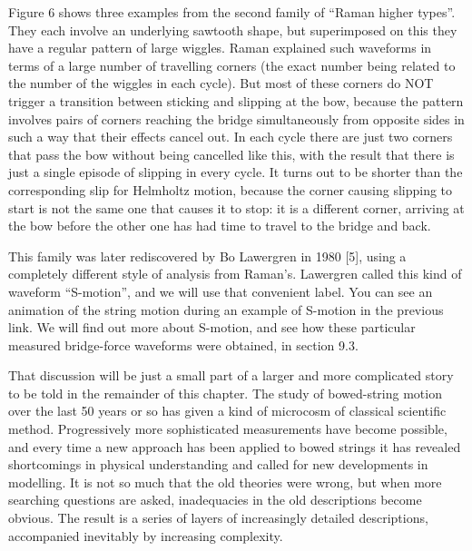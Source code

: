   Figure 6 shows three examples from the second family of “Raman higher types”. 
  They each involve an underlying sawtooth shape, but superimposed on this they 
  have a regular pattern of large wiggles. Raman explained such waveforms in 
  terms of a large number of travelling corners (the exact number being related 
  to the number of the wiggles in each cycle). But most of these corners do NOT 
  trigger a transition between sticking and slipping at the bow, because the 
  pattern involves pairs of corners reaching the bridge simultaneously from 
  opposite sides in such a way that their effects cancel out. In each cycle 
  there are just two corners that pass the bow without being cancelled like 
  this, with the result that there is just a single episode of slipping in 
  every cycle. It turns out to be shorter than the corresponding slip for 
  Helmholtz motion, because the corner causing slipping to start is not the 
  same one that causes it to stop: it is a different corner, arriving at the 
  bow before the other one has had time to travel to the bridge and back. 


  This family was later rediscovered by Bo Lawergren in 1980 [5], using a 
  completely different style of analysis from Raman’s. Lawergren called this 
  kind of waveform “S-motion”, and we will use that convenient label. You can 
  see an animation of the string motion during an example of S-motion in the 
  previous link. We will find out more about S-motion, and see how these 
  particular measured bridge-force waveforms were obtained, in section 9.3. 

  That discussion will be just a small part of a larger and more complicated 
  story to be told in the remainder of this chapter. The study of bowed-string 
  motion over the last 50 years or so has given a kind of microcosm of 
  classical scientific method. Progressively more sophisticated measurements 
  have become possible, and every time a new approach has been applied to bowed 
  strings it has revealed shortcomings in physical understanding and called for 
  new developments in modelling. It is not so much that the old theories were 
  wrong, but when more searching questions are asked, inadequacies in the old 
  descriptions become obvious. The result is a series of layers of increasingly 
  detailed descriptions, accompanied inevitably by increasing complexity. 

